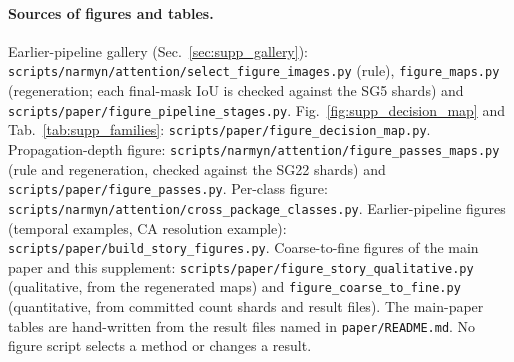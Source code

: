 \paragraph{Sources of figures and tables.}
Earlier-pipeline gallery (Sec.~\ref{sec:supp_gallery}): \texttt{scripts/\allowbreak{}narmyn/\allowbreak{}attention/\allowbreak{}select\_\allowbreak{}figure\_\allowbreak{}images.py} (rule), \texttt{figure\_maps.py} (regeneration; each final-mask IoU is checked against the SG5 shards) and \texttt{scripts/\allowbreak{}paper/\allowbreak{}figure\_\allowbreak{}pipeline\_\allowbreak{}stages.py}. Fig.~\ref{fig:supp_decision_map} and Tab.~\ref{tab:supp_families}: \texttt{scripts/\allowbreak{}paper/\allowbreak{}figure\_\allowbreak{}decision\_\allowbreak{}map.py}. Propagation-depth figure: \texttt{scripts/\allowbreak{}narmyn/\allowbreak{}attention/\allowbreak{}figure\_\allowbreak{}passes\_\allowbreak{}maps.py} (rule and regeneration, checked against the SG22 shards) and \texttt{scripts/\allowbreak{}paper/\allowbreak{}figure\_\allowbreak{}passes.py}. Per-class figure: \texttt{scripts/\allowbreak{}narmyn/\allowbreak{}attention/\allowbreak{}cross\_\allowbreak{}package\_\allowbreak{}classes.py}. Earlier-pipeline figures (temporal examples, CA resolution example): \texttt{scripts/\allowbreak{}paper/\allowbreak{}build\_\allowbreak{}story\_\allowbreak{}figures.py}. Coarse-to-fine figures of the main paper and this supplement: \texttt{scripts/\allowbreak{}paper/\allowbreak{}figure\_\allowbreak{}story\_\allowbreak{}qualitative.py} (qualitative, from the regenerated maps) and \texttt{figure\_\allowbreak{}coarse\_\allowbreak{}to\_\allowbreak{}fine.py} (quantitative, from committed count shards and result files). The main-paper tables are hand-written from the result files named in \texttt{paper/README.md}. No figure script selects a method or changes a result.
